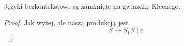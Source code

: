 \begin{theorem}
    Języki bezkontekstowe są zamknięte na gwiazdkę Kleenego.
\end{theorem}
\begin{proof}
    Jak wyżej, ale naszą produkcją jest 
    \[
        S \rightarrow S_1S \mid \varepsilon
    \]
\end{proof}

